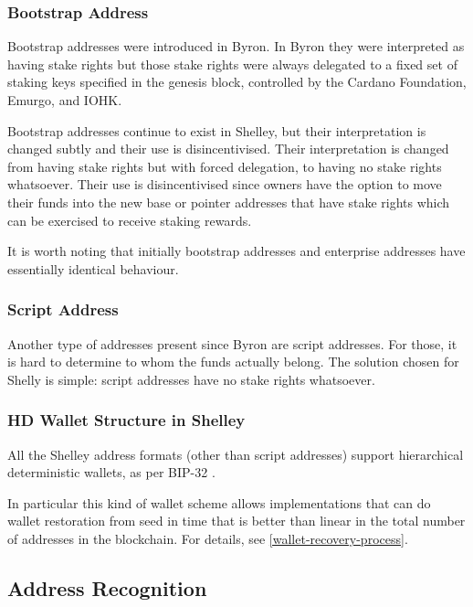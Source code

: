 \documentclass[11pt,a4paper]{article}
\begin{document}
\subsubsection{Bootstrap Address}
\label{bootstrap-address}

Bootstrap addresses were introduced in Byron. In Byron they were
interpreted as having stake rights but those stake rights were always
delegated to a fixed set of staking keys specified in the genesis block,
controlled by the Cardano Foundation, Emurgo, and IOHK.

Bootstrap addresses continue to exist in Shelley, but their
interpretation is changed subtly and their use is disincentivised.
Their interpretation is changed from having stake rights but with
forced delegation, to having no stake rights whatsoever. Their use is
disincentivised since owners have the option to move their funds into
the new base or pointer addresses that have stake rights which can be
exercised to receive staking rewards.

It is worth noting that initially bootstrap addresses and enterprise
addresses have essentially identical behaviour.

\subsubsection{Script Address}
\label{script-address}

Another type of addresses present since Byron are script addresses. For
those, it is hard to determine to whom the funds actually belong. The
solution chosen for Shelly is simple: script addresses have no stake
rights whatsoever.

\subsubsection{HD Wallet Structure in Shelley}
\label{hd-wallet-structure-in-shelley}

All the Shelley address formats (other than script addresses) support
hierarchical deterministic wallets, as per BIP-32 \citep{bip32}.

In particular this kind of wallet scheme allows implementations that can
do wallet restoration from seed in time that is better than linear in
the total number of addresses in the blockchain. For details, see
\cref{wallet-recovery-process}.

\subsection{Address Recognition}
\label{address-recognition-1}
\end{document}
